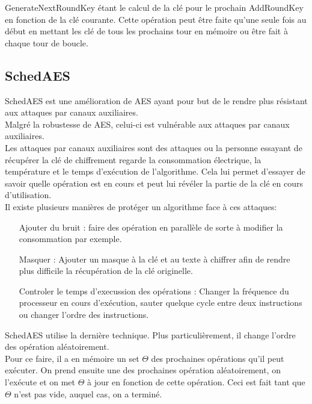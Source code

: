\documentclass[letterpaper]{article}
\begin{document}
GenerateNextRoundKey étant le calcul de la clé pour le prochain AddRoundKey en fonction de la clé courante.
Cette opération peut être faite qu'une seule fois au début en mettant les clé de tous les prochains tour en mémoire ou être fait à chaque tour de boucle.

\subsection{SchedAES}
SchedAES est une amélioration de AES ayant pour but de le rendre plus résistant aux attaques par canaux auxiliaires.\\

Malgré la robustesse de AES, celui-ci est vulnérable aux attaques par canaux auxiliaires.\\

Les attaques par canaux auxiliaires sont des attaques ou la personne essayant de récupérer la clé de chiffrement regarde la consommation électrique, la température et le temps d'exécution de l'algorithme.
Cela lui permet d'essayer de savoir quelle opération est en cours et peut lui révéler la partie de la clé en cours d'utilisation.\\

Il existe plusieurs manières de protéger un algorithme face à ces attaques:
\begin{itemize}
    \item[Ajouter du bruit :] faire des opération en parallèle de sorte à modifier la consommation par exemple.
    \item[Masquer :] Ajouter un masque à la clé et au texte à chiffrer afin de rendre plus difficile la récupération de la clé originelle.
    \item[Controler le temps d'execussion des opérations :] Changer la fréquence du processeur en cours d'exécution, sauter quelque cycle entre deux instructions ou changer l'ordre des instructions.\\
\end{itemize}

SchedAES utilise la dernière technique. Plus particulièrement, il change l'ordre des opération aléatoirement.\\

Pour ce faire, il a en mémoire un set $\Theta$ des prochaines opérations qu'il peut exécuter.
On prend ensuite une des prochaines opération aléatoirement, on l'exécute et on met $\Theta$ à jour en fonction de cette opération.
Ceci est fait tant que $\Theta$ n'est pas vide, auquel cas, on a terminé.\\
\end{document}
